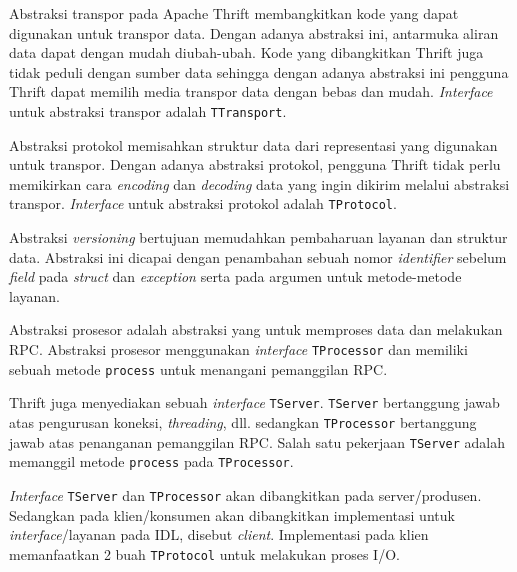 Abstraksi transpor pada Apache Thrift membangkitkan kode yang dapat
di\-gu\-na\-kan untuk transpor data. Dengan adanya abstraksi ini, antarmuka
aliran data dapat dengan mudah diubah-ubah. Kode yang dibangkitkan Thrift juga
tidak peduli dengan sumber data sehingga dengan adanya abstraksi ini pengguna
Thrift dapat memilih media transpor data dengan bebas dan mudah.
\textit{Interface} untuk abstraksi transpor adalah \texttt{TTransport}.

Abstraksi protokol memisahkan struktur data dari representasi yang digunakan
untuk transpor. Dengan adanya abstraksi protokol, pengguna Thrift tidak perlu
me\-mi\-kir\-kan cara \textit{encoding} dan \textit{decoding} data yang ingin dikirim
melalui abstraksi transpor. \textit{Interface} untuk abstraksi protokol adalah
\texttt{TProtocol}.

Abstraksi \textit{versioning} bertujuan memudahkan pembaharuan layanan dan
struktur data. Abstraksi ini dicapai dengan penambahan sebuah nomor
\textit{identifier} sebelum \textit{field} pada \textit{struct} dan
\textit{exception} serta pada argumen untuk metode-metode layanan.

Abstraksi prosesor adalah abstraksi yang untuk memproses data dan melakukan RPC.
Abstraksi prosesor menggunakan \textit{interface} \texttt{TProcessor} dan
memiliki sebuah metode \texttt{process} untuk menangani pemanggilan RPC.

Thrift juga menyediakan sebuah \textit{interface} \texttt{TServer}.
\texttt{TServer} bertanggung jawab atas pengurusan koneksi, \textit{threading},
dll. sedangkan \texttt{TProcessor} bertanggung jawab atas penanganan pemanggilan
RPC. Salah satu pekerjaan \texttt{TServer} adalah memanggil metode
\texttt{process} pada \texttt{TProcessor}.

\textit{Interface} \texttt{TServer} dan \texttt{TProcessor} akan dibangkitkan
pada server/produsen. Se\-dang\-kan pada klien/konsumen akan dibangkitkan
implementasi untuk \textit{interface}/la\-ya\-nan pada IDL, disebut
\textit{client}. Implementasi pada klien memanfaatkan 2 buah \texttt{TProtocol}
untuk melakukan proses I/O.

